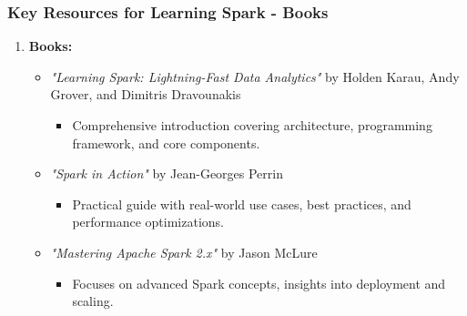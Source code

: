 \documentclass[aspectratio=169]{beamer}
\begin{document}
\begin{frame}[fragile]
    \frametitle{Key Resources for Learning Spark - Books}
    \begin{enumerate}
        \item \textbf{Books:}
        \begin{itemize}
            \item \textit{"Learning Spark: Lightning-Fast Data Analytics"} by Holden Karau, Andy Grover, and Dimitris Dravounakis
            \begin{itemize}
                \item Comprehensive introduction covering architecture, programming framework, and core components.
            \end{itemize}
            \item \textit{"Spark in Action"} by Jean-Georges Perrin
            \begin{itemize}
                \item Practical guide with real-world use cases, best practices, and performance optimizations.
            \end{itemize}
            \item \textit{"Mastering Apache Spark 2.x"} by Jason McLure
            \begin{itemize}
                \item Focuses on advanced Spark concepts, insights into deployment and scaling.
            \end{itemize}
        \end{itemize}
    \end{enumerate}
\end{frame}
\end{document}
